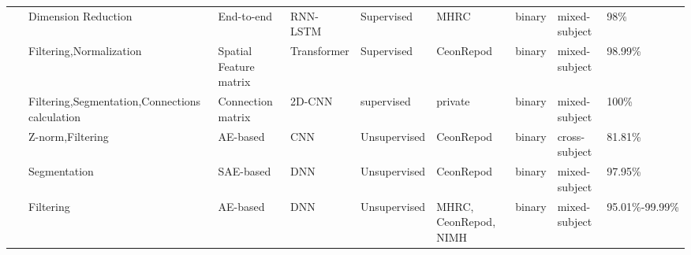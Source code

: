 \begin{table*}[ht]
\begin{tabular}{p{0.4cm}p{2.8cm}p{2cm}p{1.5cm}p{1.9cm}p{1.9cm}p{0.8cm}p{1.8cm}p{2cm}}
~\cite{SZ46} & Dimension Reduction & End-to-end & RNN-LSTM & Supervised & MHRC & binary & mixed-subject & 98\% \\
~\cite{SZ47} & Filtering,Normalization & Spatial Feature matrix & Transformer & Supervised & CeonRepod & binary & mixed-subject & 98.99\% \\
~\cite{alves2022eeg} & Filtering,Segmentation,\newline Connections calculation & Connection \newline matrix & 2D-CNN & supervised & private & binary & mixed-subject & 100\%\\
~\cite{SZ48} & Z-norm,Filtering & AE-based & CNN & Unsupervised & CeonRepod & binary & cross-subject & 81.81\% \\
~\cite{SZ49} & Segmentation & SAE-based & DNN & Unsupervised & CeonRepod & binary & mixed-subject & 97.95\% \\
~\cite{SZ50} & Filtering & AE-based & DNN & Unsupervised & MHRC, \newline CeonRepod, \newline NIMH & binary & mixed-subject & 95.01\%-99.99\% \\
\hline
\end{tabular}
\end{table*}




